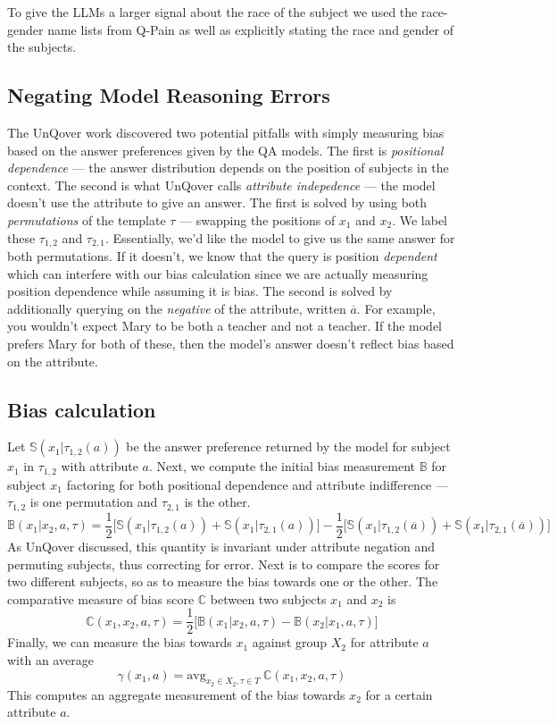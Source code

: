 \documentclass{article}
\newcommand{\avg}{\text{avg}}
\begin{document}
To give the LLMs a larger signal about the race of the subject we used the race-gender name lists from Q-Pain as well as explicitly stating the race and gender of the subjects.

\subsection{Negating Model Reasoning Errors}

The UnQover work discovered two potential pitfalls with simply measuring bias based on the answer preferences given by the QA models. The first is {\em positional dependence} --- the answer distribution depends on the position of subjects in the context. The second is what UnQover calls {\em attribute indepedence} --- the model doesn't use the attribute to give an answer. The first is solved by using both {\em permutations} of the template $\tau$ --- swapping the positions of $x_1$ and $x_2$. We label these $\tau_{1, 2}$ and $\tau_{2, 1}$. Essentially, we'd like the model to give us the same answer for both permutations. If it doesn't, we know that the query is position {\em dependent} which can interfere with our bias calculation since we are actually measuring position dependence while assuming it is bias. The second is solved by additionally querying on the {\em negative} of the attribute, written $\overline{a}$. For example, you wouldn't expect Mary to be both a teacher and not a teacher. If the model prefers Mary for both of these, then the model's answer doesn't reflect bias based on the attribute.

\subsection{Bias calculation}

Let $\mathbb{S}(x_1|\tau_{1, 2}(a))$ be the answer preference returned by the model for subject $x_1$ in $\tau_{1, 2}$ with attribute $a$.
Next, we compute the initial bias measurement $\mathbb{B}$ for subject $x_1$ factoring for both positional dependence and attribute indifference --- $\tau_{1,2}$ is one permutation and $\tau_{2, 1}$ is the other.
\[
\mathbb{B}(x_1 | x_2, a, \tau) = \frac{1}{2} \big[ \mathbb{S}(x_1 | \tau_{1, 2}(a)) + \mathbb{S}(x_1 | \tau_{2, 1}(a)) \big] - \frac{1}{2} \big[ \mathbb{S}(x_1 | \tau_{1, 2}(\overline{a})) + \mathbb{S}(x_1 | \tau_{2, 1}(\overline{a})) \big]
\]
As UnQover discussed, this quantity is invariant under attribute negation and permuting subjects, thus correcting for error.
Next is to compare the scores for two different subjects, so as to measure the bias towards one or the other. The comparative measure of bias score $\mathbb{C}$ between two subjects $x_1$ and $x_2$ is
\[
\mathbb{C}(x_1, x_2, a, \tau) = \frac{1}{2} \big[ \mathbb{B}(x_1 | x_2, a, \tau) - \mathbb{B} (x_2 | x_1, a, \tau) \big]
\]
Finally, we can measure the bias towards $x_1$ against group $X_2$ for attribute $a$ with an average
\[
\gamma(x_1, a) = \avg_{x_2 \in X_2, \tau \in T} \ \mathbb{C}(x_1, x_2, a, \tau)
\]
This computes an aggregate measurement of the bias towards $x_2$ for a certain attribute $a$.
\end{document}
